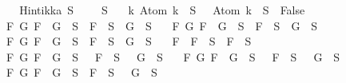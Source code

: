 \begin{isabellebody}
%
\isadelimproof
%
\endisadelimproof
%
\isatagproof
{}\isamarkupfalse%
\ {\isacharminus}\isanewline
\ \ \isamarkupfalse%
\ {\isachardoublequoteopen}Hintikka\ S\ {\isacharequal}\ {\isacharparenleft}\ {\isasymbottom}\ {\isasymnotin}\ S\isanewline
\ \ {\isasymand}\ {\isacharparenleft}{\isasymforall}k{\isachardot}\ Atom\ k\ {\isasymin}\ S\ {\isasymlongrightarrow}\ \isactrlbold {\isasymnot}\ {\isacharparenleft}Atom\ k{\isacharparenright}\ {\isasymin}\ S\ {\isasymlongrightarrow}\ False{\isacharparenright}\isanewline
\ \ {\isasymand}\ {\isacharparenleft}{\isasymforall}F\ G{\isachardot}\ F\ \isactrlbold {\isasymand}\ G\ {\isasymin}\ S\ {\isasymlongrightarrow}\ F\ {\isasymin}\ S\ {\isasymand}\ G\ {\isasymin}\ S{\isacharparenright}\isanewline
\ \ {\isasymand}\ {\isacharparenleft}{\isasymforall}F\ G{\isachardot}\ F\ \isactrlbold {\isasymor}\ G\ {\isasymin}\ S\ {\isasymlongrightarrow}\ F\ {\isasymin}\ S\ {\isasymor}\ G\ {\isasymin}\ S{\isacharparenright}\isanewline
\ \ {\isasymand}\ {\isacharparenleft}{\isasymforall}F\ G{\isachardot}\ F\ \isactrlbold {\isasymrightarrow}\ G\ {\isasymin}\ S\ {\isasymlongrightarrow}\ \isactrlbold {\isasymnot}F\ {\isasymin}\ S\ {\isasymor}\ G\ {\isasymin}\ S{\isacharparenright}\isanewline
\ \ {\isasymand}\ {\isacharparenleft}{\isasymforall}F{\isachardot}\ \isactrlbold {\isasymnot}\ {\isacharparenleft}\isactrlbold {\isasymnot}F{\isacharparenright}\ {\isasymin}\ S\ {\isasymlongrightarrow}\ F\ {\isasymin}\ S{\isacharparenright}\isanewline
\ \ {\isasymand}\ {\isacharparenleft}{\isasymforall}F\ G{\isachardot}\ \isactrlbold {\isasymnot}{\isacharparenleft}F\ \isactrlbold {\isasymand}\ G{\isacharparenright}\ {\isasymin}\ S\ {\isasymlongrightarrow}\ \isactrlbold {\isasymnot}\ F\ {\isasymin}\ S\ {\isasymor}\ \isactrlbold {\isasymnot}\ G\ {\isasymin}\ S{\isacharparenright}\isanewline
\ \ {\isasymand}\ {\isacharparenleft}{\isasymforall}F\ G{\isachardot}\ \isactrlbold {\isasymnot}{\isacharparenleft}F\ \isactrlbold {\isasymor}\ G{\isacharparenright}\ {\isasymin}\ S\ {\isasymlongrightarrow}\ \isactrlbold {\isasymnot}\ F\ {\isasymin}\ S\ {\isasymand}\ \isactrlbold {\isasymnot}\ G\ {\isasymin}\ S{\isacharparenright}\isanewline
\ \ {\isasymand}\ {\isacharparenleft}{\isasymforall}F\ G{\isachardot}\ \isactrlbold {\isasymnot}{\isacharparenleft}F\ \isactrlbold {\isasymrightarrow}\ G{\isacharparenright}\ {\isasymin}\ S\ {\isasymlongrightarrow}\ F\ {\isasymin}\ S\ {\isasymand}\ \isactrlbold {\isasymnot}\ G\ {\isasymin}\ S{\isacharparenright}{\isacharparenright}{\isachardoublequoteclose}\ \isanewline
\ \ \ \ \isamarkupfalse%

\end{isabellebody}
